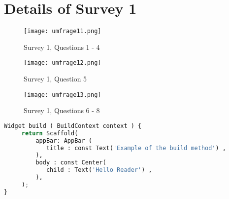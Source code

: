 
\clearpage
\appendix
{} 
\newcommand{\nocontentsline}[3]{}
\newcommand{\tocless}[2]{\bgroup\let\addcontentsline=\nocontentsline#1{#2}\egroup}

\tocless\chapter{Details of Survey 1}
\begin{center}
\begin{figure}[H]
	\centering
	\texttt{[image: umfrage11.png]}
			\caption{Survey 1, Questions 1 - 4}
\end{figure}
\begin{figure}[H]
	\centering
	\texttt{[image: umfrage12.png]}
		\caption{Survey 1, Question 5}
\end{figure}
\begin{figure}[H]
	\centering
	\texttt{[image: umfrage13.png]}
	\caption{Survey 1, Questions 6 - 8}
\end{figure}
\end{center}
\pagebreak


\tocless\chapter{Code Snippet of Widget Tree}
\begin{lstlisting}[language=Python, caption={Code Snipped of Widget Tree}]
Widget build ( BuildContext context ) {
	 return Scaffold(
		 appBar: AppBar (
		 	title : const Text('Example of the build method') ,
	 	 ),
		 body : const Center(
		 	child : Text('Hello Reader') ,
		 ),
	 );
}
\end{lstlisting}
\pagebreak


